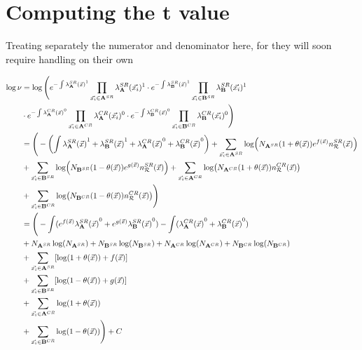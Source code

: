 \documentclass[../../ddppaper2.tex]{subfiles}
\begin{document}
\section{Computing the t value}\label{Appendix_Tvalue}


Treating separately the numerator and denominator here, for they will soon require handling on their own

{\scriptsize
\begin{equation}
\label{eq:overall_test_statistic_numerator}
\begin{aligned}
    \log \nu &= \log \Bigg(
        e^{- \int \srdist{\dataset{A}}^1} \prod\limits_{\event \in \srdataset{A}} \srdistevent{\dataset{A}}^1
        \cdot
        e^{- \int \srdist{\dataset{B}}^1} \prod\limits_{\event \in \srdataset{B}} \srdistevent{\dataset{B}}^1 \\&
        \cdot
        e^{- \int \crdist{\dataset{A}}^0} \prod\limits_{\event \in \crdataset{A}} \crdistevent{\dataset{A}}^0
        \cdot
        e^{- \int \crdist{\dataset{B}}^0} \prod\limits_{\event \in \crdataset{B}} \crdistevent{\dataset{B}}^0
    \Bigg)
    \\
    &= \Bigg(
        - \left(
            \int \srdist{\dataset{A}}^1 + \srdist{\dataset{B}}^1
            + \crdist{\dataset{A}}^0 + \crdist{\dataset{B}}^0
        \right)
        + \sum\limits_{\event \in \srdataset{A}} \log({N_\srdataset{A}} (1 + {\nparam(\anyevent)}) e^{f(\anyevent)} \srrefdist) \\&
        + \sum\limits_{\event \in \srdataset{B}} \log({N_\srdataset{B}}  (1 - {\nparam(\anyevent)}) e^{g(\anyevent)} \srrefdist)
        + \sum\limits_{\event \in \crdataset{A}} \log({N_\crdataset{A}} (1 + {\nparam(\anyevent)}) \crrefdist) \\&
        + \sum\limits_{\event \in \crdataset{B}} \log({N_\crdataset{B}}  (1 - {\nparam(\anyevent)}) \crrefdist)
    \Bigg)
    \\
    &= \Bigg(
            - \int (e^{f(\anyevent)}\srdist{\dataset{A}}^0 + e^{g(\anyevent)}\srdist{\dataset{B}}^0 )
            - \int (\crdist{\dataset{A}}^0 + \crdist{\dataset{B}}^0)
        \\&
        + N_{\srdataset{A}}\log({N_\srdataset{A}})
        + N_{\srdataset{B}}\log({N_\srdataset{B}})
        + N_{\crdataset{A}}\log({N_\crdataset{A}})
        + N_{\crdataset{B}}\log({N_\crdataset{B}})
        \\&
        + \sum\limits_{\event \in \srdataset{A}} [\log(1 + {\nparam(\anyevent)}) + f(\anyevent)] \\&
        + \sum\limits_{\event \in \srdataset{B}} [\log(1 - {\nparam(\anyevent)}) + g(\anyevent)] \\&
        + \sum\limits_{\event \in \crdataset{A}} \log(1 + {\nparam(\anyevent)}) \\&
        + \sum\limits_{\event \in \crdataset{B}} \log(1 - {\nparam(\anyevent)})
    \Bigg) + C
\end{aligned}
\end{equation}
}
\end{document}
